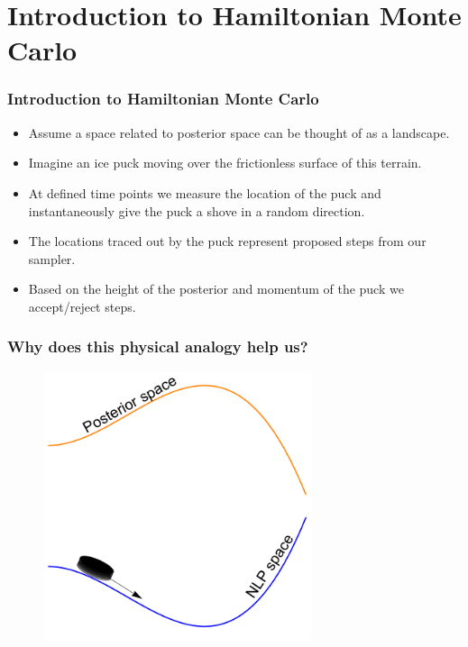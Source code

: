 \documentclass[handout]{beamer}
\begin{document}
\section{Introduction to Hamiltonian Monte Carlo}
\frame{\tableofcontents[currentsection]}

\begin{frame}
	\frametitle{Introduction to Hamiltonian Monte Carlo}
	\begin{itemize}
		\item<2-> Assume a space related to posterior space can be thought of as a landscape.
		\item<3-> Imagine an ice puck moving over the frictionless surface of this terrain.
		\item<4-> At defined time points we measure the location of the puck and instantaneously give the puck a shove in a random direction.
		\item<5-> The locations traced out by the puck represent proposed steps from our sampler.
		\item<6-> Based on the height of the posterior and momentum of the puck we accept/reject steps.
	\end{itemize}
	
\end{frame}

\begin{frame}
	\frametitle{Why does this physical analogy help us?}
	
	\begin{figure}[ht]
		\centerline{\includegraphics[width=0.7\textwidth]{animations_figures/lec5_icePuck.pdf}}
	\end{figure}
	
\end{frame}
\end{document}
